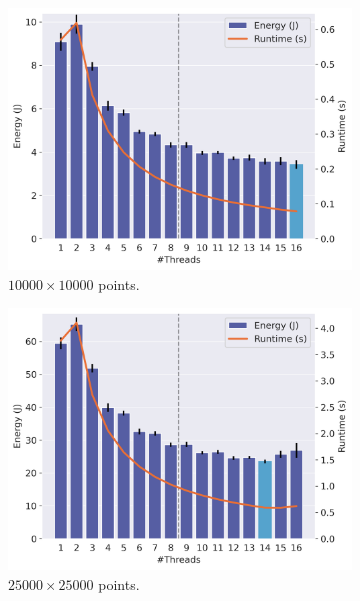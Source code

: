 \begin{figure}[!ht]
    \centering
    \begin{subfigure}{0.33\linewidth}
        \includegraphics[width=\linewidth]{images/stencil_10000.png}
        \caption{$10000 \times 10000$ points.}
        \label{fig:stencil1}
    \end{subfigure}%
    \begin{subfigure}{0.33\linewidth}
        \includegraphics[width=\linewidth]{images/stencil_25000.png}
        \caption{$25000 \times 25000$ points.}
        \label{fig:stencil2}
    \end{subfigure}%
    \begin{subfigure}{0.33\linewidth}

\end{subfigure}
\end{figure}
